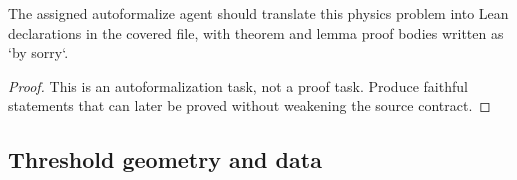 \begin{theorem}
\label{thm:physics:IPhO_2026_2_A_1:target}
The assigned autoformalize agent should translate this physics problem into Lean declarations in the covered file, with theorem and lemma proof bodies written as `by sorry`.
\end{theorem}
\begin{proof}
This is an autoformalization task, not a proof task. Produce faithful statements that can later be proved without weakening the source contract.
\end{proof}

\subsection*{Threshold geometry and data}

